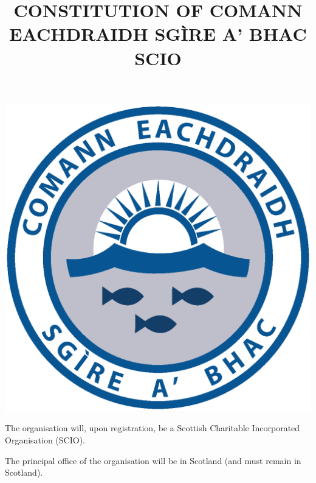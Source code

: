 ﻿\documentclass[a4paper,11pt,onecolumn ]{article}
\title{CONSTITUTION OF COMANN EACHDRAIDH SGÌRE A’ BHAC SCIO}
\begin{document}
\maketitle

\begin{center}
\includegraphics[width=0.3\paperwidth]{cebac-logo}
\end{center}

\pagebreak

\tableofcontents

\pagebreak



\begin{legal}
\item The organisation will, upon registration, be a Scottish Charitable Incorporated Organisation (SCIO).
\end{legal}


\begin{legal}
\item The principal office of the organisation will be in Scotland (and must remain in Scotland).
\end{legal}

\end{document}
